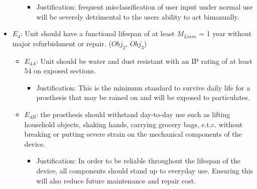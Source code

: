\documentclass[12pt,3p]{elsarticle}
\begin{document}
\begin{itemize}
\begin{itemize}
		\begin{itemize}
		\item Justification: frequent misclassification of user input under normal use will  be severely detrimental to the users ability to act bimanually.
		\end{itemize}
		
	\end{itemize}
	
\item $E_4$: Unit should have a functional lifespan of at least $M_{Lmin}$ = 1 year without major refurbishment or repair. ($Obj_2$, $Obj_3$)
	\begin{itemize}
	
	\item $E_{4A}$: Unit should be water and dust resistant with an IP rating of at least 54 on exposed sections.
		\begin{itemize}
		\item Justification: This is the minimum standard to survive daily life for a prosthesis that may be rained on and will be exposed to particulates.
		\end{itemize}
		\item $E_{4B}$: the prosthesis should withstand day-to-day use such as lifting household objects, shaking hands, carrying grocery bags, e.t.c. without breaking or putting severe strain on the mechanical components of the device.
		\begin{itemize}
		\item Justification: In order to be reliable throughout the lifespan of the device, all components should stand up to everyday use. Ensuring this will also reduce future maintenance and repair cost.
		\end{itemize}	
	\end{itemize}
	
\end{itemize}
\end{document}
